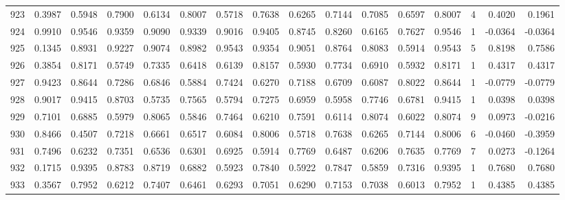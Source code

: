 \begin{tabular}{lrrrrrrrrrrrrrrr}
923 &      0.3987 &  0.5948 &  0.7900 &  0.6134 &  0.8007 &  0.5718 &  0.7638 &  0.6265 &  0.7144 &  0.7085 &   0.6597 &     0.8007 &      4 &                    0.4020 &                     0.1961 \\
924 &      0.9910 &  0.9546 &  0.9359 &  0.9090 &  0.9339 &  0.9016 &  0.9405 &  0.8745 &  0.8260 &  0.6165 &   0.7627 &     0.9546 &      1 &                   -0.0364 &                    -0.0364 \\
925 &      0.1345 &  0.8931 &  0.9227 &  0.9074 &  0.8982 &  0.9543 &  0.9354 &  0.9051 &  0.8764 &  0.8083 &   0.5914 &     0.9543 &      5 &                    0.8198 &                     0.7586 \\
926 &      0.3854 &  0.8171 &  0.5749 &  0.7335 &  0.6418 &  0.6139 &  0.8157 &  0.5930 &  0.7734 &  0.6910 &   0.5932 &     0.8171 &      1 &                    0.4317 &                     0.4317 \\
927 &      0.9423 &  0.8644 &  0.7286 &  0.6846 &  0.5884 &  0.7424 &  0.6270 &  0.7188 &  0.6709 &  0.6087 &   0.8022 &     0.8644 &      1 &                   -0.0779 &                    -0.0779 \\
928 &      0.9017 &  0.9415 &  0.8703 &  0.5735 &  0.7565 &  0.5794 &  0.7275 &  0.6959 &  0.5958 &  0.7746 &   0.6781 &     0.9415 &      1 &                    0.0398 &                     0.0398 \\
929 &      0.7101 &  0.6885 &  0.5979 &  0.8065 &  0.5846 &  0.7464 &  0.6210 &  0.7591 &  0.6114 &  0.8074 &   0.6022 &     0.8074 &      9 &                    0.0973 &                    -0.0216 \\
930 &      0.8466 &  0.4507 &  0.7218 &  0.6661 &  0.6517 &  0.6084 &  0.8006 &  0.5718 &  0.7638 &  0.6265 &   0.7144 &     0.8006 &      6 &                   -0.0460 &                    -0.3959 \\
931 &      0.7496 &  0.6232 &  0.7351 &  0.6536 &  0.6301 &  0.6925 &  0.5914 &  0.7769 &  0.6487 &  0.6206 &   0.7635 &     0.7769 &      7 &                    0.0273 &                    -0.1264 \\
932 &      0.1715 &  0.9395 &  0.8783 &  0.8719 &  0.6882 &  0.5923 &  0.7840 &  0.5922 &  0.7847 &  0.5859 &   0.7316 &     0.9395 &      1 &                    0.7680 &                     0.7680 \\
933 &      0.3567 &  0.7952 &  0.6212 &  0.7407 &  0.6461 &  0.6293 &  0.7051 &  0.6290 &  0.7153 &  0.7038 &   0.6013 &     0.7952 &      1 &                    0.4385 &                     0.4385 \\

\end{tabular}
